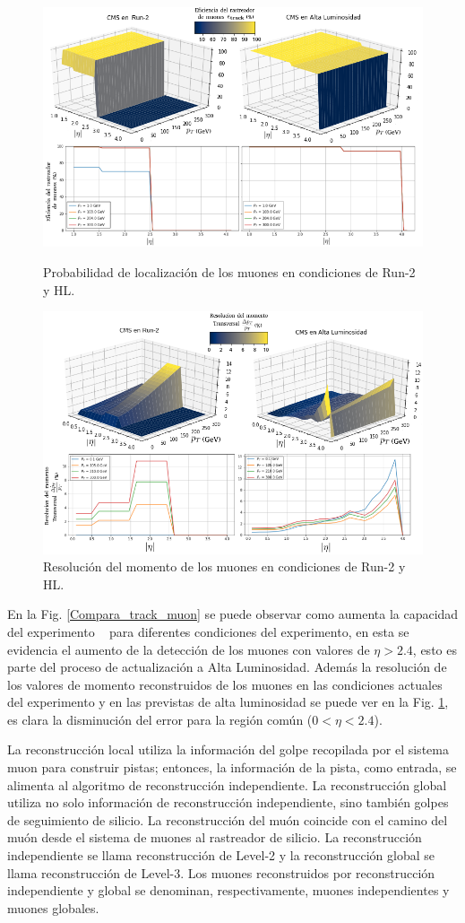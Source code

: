 \begin{figure}[!t]
\centering
\includegraphics[width=.90\textwidth]{Cap2/imagenes/Tracking_of_Muon.png}
\caption{Probabilidad de localización de los muones en condiciones de Run-2 y HL.}
\label{Compara_track_muon}
\includegraphics[width=.90\textwidth]{Cap2/imagenes/Momentum_resolution_of_Muon.png}
\caption{Resolución del momento de los muones en condiciones de Run-2 y HL.}
\label{Compara_sol_muon}
\end{figure}
En la Fig. \ref{Compara_track_muon} se puede observar como aumenta la capacidad del experimento \CMS ~ para diferentes condiciones del experimento, en esta se evidencia el aumento de la detección de los muones con valores de $\eta > 2.4$, esto es parte del proceso de actualización a Alta Luminosidad. Además la resolución de los valores de momento reconstruidos de los muones en las condiciones actuales del experimento y en las previstas de alta luminosidad se puede ver en la Fig. \ref{Compara_sol_muon}, es clara la disminución del error para la región común ($0<\eta < 2.4$).

La reconstrucción local utiliza la información del golpe recopilada por el sistema muon para construir pistas; entonces, la información de la pista, como entrada, se alimenta al algoritmo de reconstrucción independiente. La reconstrucción global utiliza no solo información de reconstrucción independiente, sino también golpes de seguimiento de silicio. La reconstrucción del muón coincide con el camino del muón desde el sistema de muones al rastreador de silicio. La reconstrucción independiente se llama reconstrucción de Level-2 y la reconstrucción global se llama reconstrucción de Level-3. Los muones reconstruidos por reconstrucción independiente y global se denominan, respectivamente, muones independientes y muones globales.



